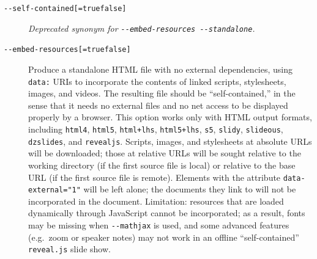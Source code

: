 \documentclass[
]{article}
\begin{document}
\begin{description}
\item[\texttt{-\/-self-contained{[}=true\textbar{}false{]}}]
\emph{Deprecated synonym for
\texttt{-\/-embed-resources\ -\/-standalone}.}
\item[\texttt{-\/-embed-resources{[}=true\textbar{}false{]}}]
Produce a standalone HTML file with no external dependencies, using
\texttt{data:} URIs to incorporate the contents of linked scripts,
stylesheets, images, and videos. The resulting file should be
``self-contained,'' in the sense that it needs no external files and no
net access to be displayed properly by a browser. This option works only
with HTML output formats, including \texttt{html4}, \texttt{html5},
\texttt{html+lhs}, \texttt{html5+lhs}, \texttt{s5}, \texttt{slidy},
\texttt{slideous}, \texttt{dzslides}, and \texttt{revealjs}. Scripts,
images, and stylesheets at absolute URLs will be downloaded; those at
relative URLs will be sought relative to the working directory (if the
first source file is local) or relative to the base URL (if the first
source file is remote). Elements with the attribute
\texttt{data-external="1"} will be left alone; the documents they link
to will not be incorporated in the document. Limitation: resources that
are loaded dynamically through JavaScript cannot be incorporated; as a
result, fonts may be missing when \texttt{-\/-mathjax} is used, and some
advanced features (e.g.~zoom or speaker notes) may not work in an
offline ``self-contained'' \texttt{reveal.js} slide show.


\end{description}
\end{document}
